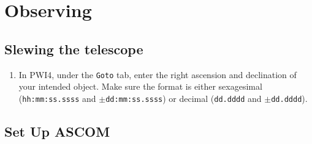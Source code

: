 \documentclass{article}
\begin{document}
	\newpage
	\section{Observing}
	
	\subsection{Slewing the telescope}
	
	\begin{enumerate}
		
		\item In PWI4, under the \texttt{Goto} tab, enter the right ascension and declination of your intended object. Make sure the format is either sexagesimal (\texttt{hh:mm:ss.ssss} and \texttt{$\pm$dd:mm:ss.ssss}) or decimal (\texttt{dd.dddd} and \texttt{$\pm$dd.dddd}).
		
	\end{enumerate}
	
	\subsection{Set Up ASCOM}
	
\end{document}

